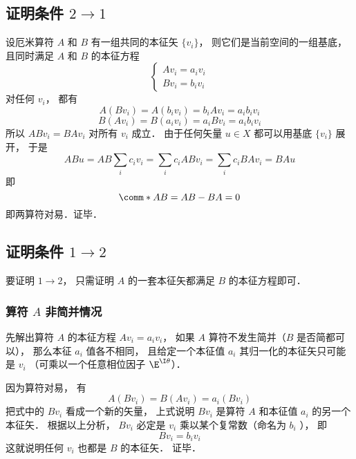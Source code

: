 \subsection{证明条件 $2 \to 1$}
设厄米算符 $A$ 和 $B$ 有一组共同的本征矢 $\{v_i\}$， 则它们是当前空间的一组基底， 且同时满足 $A$ 和 $B$ 的本征方程
\begin{equation}
\begin{cases}
A v_i = a_i v_i\\
B v_i = b_i v_i
\end{cases}
\end{equation}
对任何 $v_i$，  都有
\begin{equation}
A (B v_i) = A (b_i v_i) = b_iA v_i = a_i b_i v_i
\end{equation}
\begin{equation}
B (A v_i) = B (a_i v_i) = a_i B v_i = a_i b_i v_i
\end{equation}
所以 $AB v_i = BA v_i$ 对所有 $v_i$ 成立． 由于任何矢量 $u \in X$ 都可以用基底 $\{v_i\}$ 展开， 于是
\begin{equation}
AB u = AB \sum_i c_i v_i = \sum_i c_i  AB v_i = \sum_i c_i BA v_i = BA u
\end{equation}
即
\begin{equation}
\comm*{A}{B} = AB - BA = 0
\end{equation}
即两算符对易．证毕．

\subsection{证明条件 $1 \to 2$}

要证明 $1 \to 2$，  只需证明 $A$ 的一套本征矢都满足 $B$ 的本征方程即可．

\subsubsection{算符 $A$ 非简并情况}

先解出算符 $A$ 的本征方程 $A v_i = a_i v_i$，  如果 $A$ 算符不发生简并（$B$ 是否简都可以）， 那么本征 $a_i$ 值各不相同， 且给定一个本征值 $a_i$ 其归一化的本征矢只可能是 $v_i$ （可乘以一个任意相位因子 $\E^{\I\theta}$）．

因为算符对易， 有
\begin{equation}
A (B v_i) = B (A v_i) = a_i (B v_i)
\end{equation}
把式中的 $B v_i$ 看成一个新的矢量， 上式说明 $B v_i$ 是算符 $A$ 和本征值 $a_i$ 的另一个本征矢． 根据以上分析， $B v_i$ 必定是 $v_i$ 乘以某个复常数（命名为 $b_i$ ）， 即
\begin{equation}
B v_i = b_i v_i
\end{equation}
这就说明任何 $v_i$ 也都是 $B$ 的本征矢． 证毕．

